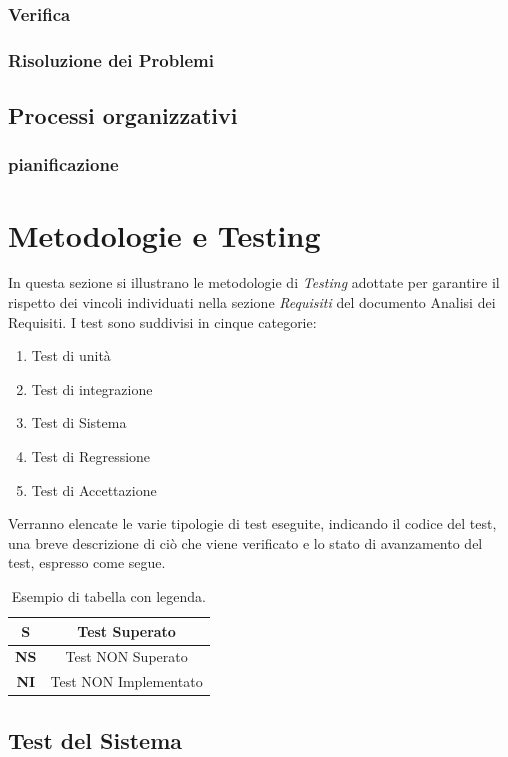 \documentclass{article}
\begin{document}
\subsubsection{Verifica}%
\subsubsection{Risoluzione dei Problemi}%
\subsection{Processi organizzativi}
\subsubsection{pianificazione} %
\newpage

\section{Metodologie e Testing}
In questa sezione si illustrano le metodologie di \textit{Testing} adottate per garantire il rispetto dei vincoli individuati
nella sezione \textit{Requisiti} del documento Analisi dei Requisiti. I test sono suddivisi in cinque categorie:
\begin{enumerate}
    \item Test di unità
    \item Test di integrazione
    \item Test di Sistema
    \item Test di Regressione
    \item Test di Accettazione
\end{enumerate}
Verranno elencate le varie tipologie di test eseguite, indicando il codice del test, una breve descrizione di ciò che viene verificato e lo stato di avanzamento del test, espresso come segue.

\begin{table}
    \centering
\begin{tabular}{|c|c|}
    \hline
    \textbf{S} & Test Superato \\
    \hline
    \textbf{NS} & Test NON Superato \\
    \hline
    \textbf{NI} & Test NON Implementato \\
    \hline
\end{tabular}
\caption{Esempio di tabella con legenda.}
\end{table}


\subsection{Test del Sistema} %
\end{document}

